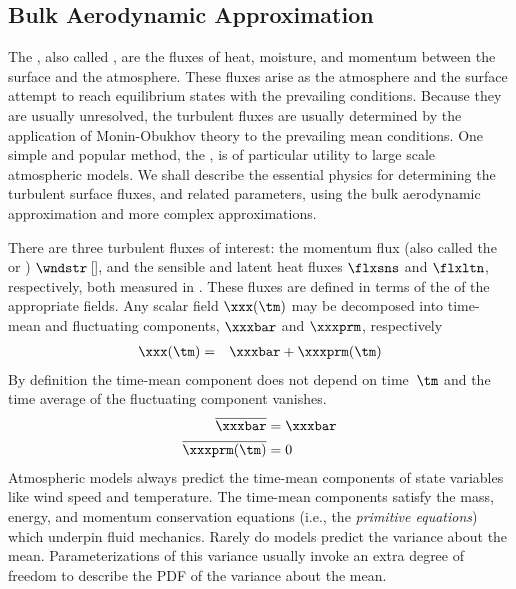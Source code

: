 \documentclass[12pt,twoside]{book}
\begin{document}
\subsection[Bulk Aerodynamic Approximation]{Bulk Aerodynamic Approximation}\label{sxn:bad}
The , also called , are the fluxes of heat, moisture, and momentum between the
surface and the atmosphere.
These fluxes arise as the atmosphere and the surface attempt to reach
equilibrium states with the prevailing conditions.
Because they are usually unresolved, the turbulent fluxes are usually 
determined by the application of Monin-Obukhov theory to the
prevailing mean conditions.
One simple and popular method, the 
, is of particular utility to
large scale atmospheric models. 
We shall describe the essential physics for determining the turbulent
surface fluxes, and related parameters, using the bulk aerodynamic
approximation and more complex approximations.

There are three turbulent fluxes of interest: the momentum flux (also
called the  or )
$\wndstr$\,[\kgxmsS], and the sensible and latent heat fluxes
$\flxsns$ and $\flxltn$, respectively, both measured in \wxmS. 
These fluxes are defined in terms of the  of the
appropriate fields.
Any scalar field $\xxx(\tm)$ may be decomposed into time-mean and
fluctuating  components, $\xxxbar$ and $\xxxprm$, respectively 
\begin{eqnarray}
\xxx(\tm) & = & \xxxbar + \xxxprm(\tm) %
\label{eqn:flc_dfn}
\end{eqnarray}
By definition the time-mean component does not depend on time~$\tm$ 
and the time average of the fluctuating component vanishes.
\begin{subequations}
\label{eqn:flc_prp_dfn}
\begin{align}
\label{eqn:flc_prp_avg_dfn}
\overline{\xxxbar} & = \xxxbar \\
\label{eqn:flc_prp_flc_dfn}
\overline{\xxxprm(\tm)} & = 0 
\end{align}
\end{subequations}
Atmospheric models always predict the time-mean components of state
variables like wind speed and temperature.
The time-mean components satisfy the mass, energy, and momentum
conservation equations (i.e., the \textit{primitive equations})
which underpin fluid mechanics.
Rarely do models predict the variance about the mean.
Parameterizations of this variance usually invoke an extra degree of
freedom to describe the PDF of the variance about the mean.
\end{document}
